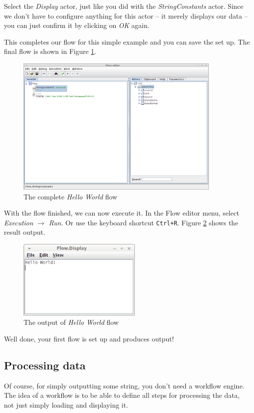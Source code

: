 Select the \textit{Display} actor, just like you did with the
\textit{StringConstants} actor. Since we don't have to configure anything for
this actor -- it merely displays our data -- you can just confirm it by clicking
on \textit{OK} again.

This completes our flow for this simple example and you can save the set up. The
final flow is shown in Figure \ref{floweditor-helloworld-flow}.

\begin{figure}[htb]
  \centering
  \includegraphics[width=10.0cm]{images/floweditor-helloworld-flow.png}
  \caption{The complete \textit{Hello World} flow}
  \label{floweditor-helloworld-flow}
\end{figure}

With the flow finished, we can now execute it. In the Flow editor menu, select
\textit{Execution $\rightarrow$ Run}. Or use the keyboard shortcut
\texttt{Ctrl+R}. Figure \ref{floweditor-helloworld-output} shows the result
output.

\begin{figure}[htb]
  \centering
  \includegraphics[width=6.0cm]{images/floweditor-helloworld-output.png}
  \caption{The output of \textit{Hello World} flow}
  \label{floweditor-helloworld-output}
\end{figure}

Well done, your first flow is set up and produces output!

\clearpage
\subsection{Processing data}
Of course, for simply outputting some string, you don't need a workflow engine.
The idea of a workflow is to be able to define all steps for
processing the data, not just simply loading and displaying it.

